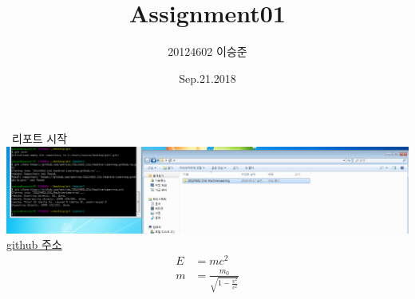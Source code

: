 \documentclass[12pt]{article}
\title{Assignment01}
\author{20124602 이승준}
\date{Sep.21.2018}
\begin{document}
  \maketitle
  \ 리포트 시작
	\centering
	\includegraphics[width=\textheight]{git01}
	\href{https://github.com/antivec/20124602_CAU_Machine-Learning}{github 주소}
  \begin{align}
    E &= mc^2                              \\
    m &= \frac{m_0}{\sqrt{1-\frac{v^2}{c^2}}}
  \end{align}
\end{document}
